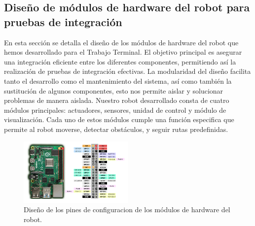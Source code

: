\subsection{Dise\~no de m\'odulos de hardware del robot para pruebas de integraci\'on}
    En esta secci\'on se detalla el dise\~no de los m\'odulos de hardware del robot que hemos
        desarrollado para el Trabajo Terminal. El objetivo principal es asegurar una integraci\'on
        eficiente entre los diferentes componentes, permitiendo as\'i la realizaci\'on de pruebas
        de integraci\'on efectivas. La modularidad del dise\~no facilita tanto el desarrollo como el
        mantenimiento del sistema, as\'i como tambi\'en la sustituci\'on de algunos componentes,
        esto nos permite aislar y solucionar problemas de manera aislada.
    \vskip 0.5cm
    Nuestro robot desarrollado consta de cuatro m\'odulos principales: actuadores,
        sensores, unidad de control y m\'odulo de visualizaci\'on. Cada uno de estos m\'odulos
        cumple una funci\'on especifica que permite al robot moverse, detectar obst\'aculos, y
        seguir rutas predefinidas.
    \vskip 0.5cm
    \begin{figure}[htbp]
        \centering
        \includegraphics[width=0.5\textwidth]{./images/Pruebas/robot/robot01.png}
        \caption{Dise\~no de los pines de configuracion de los m\'odulos de hardware del robot.}
        \label{fig:robot}
    \end{figure}

